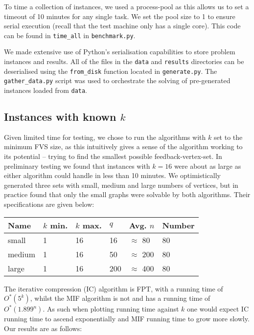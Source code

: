 \documentclass[a4paper,12pt]{article}
\newcommand{\OStar}{O^*}
\begin{document}
To time a collection of instances, we used a process-pool as this allows us to set a timeout of 10 minutes for any single task. We set the pool size to 1 to ensure serial execution (recall that the test machine only has a single core). This code can be found in \texttt{time\_all} in \texttt{benchmark.py}.

We made extensive use of Python's serialisation capabilities to store problem instances and results. All of the files in the \texttt{data} and \texttt{results} directories can be deserialised using the \texttt{from\_disk} function located in \texttt{generate.py}. The \texttt{gather\_data.py} script was used to orchestrate the solving of pre-generated instances loaded from \texttt{data}.

\subsection{Instances with known $k$}

Given limited time for testing, we chose to run the algorithms with $k$ set to the minimum FVS size, as this intuitively gives a sense of the algorithm working to its potential -- trying to find the smallest possible feedback-vertex-set. In preliminary testing we found that instances with $k = 16$ were about as large as either algorithm could handle in less than 10 minutes. We optimistically generated three sets with small, medium and large numbers of vertices, but in practice found that only the small graphs were solvable by both algorithms. Their specifications are given below:

\begin{tabular}{|l|l|l|l|l|l|}
\hline
\textbf{Name} & \textbf{$k$ min.} & \textbf{$k$ max.} & $q$ & \textbf{Avg. $n$} & \textbf{Number} \\ \hline
small & 1 & 16 & 16 & $\approx$ 80 & 80 \\ \hline
medium & 1 & 16 & 50 & $\approx$ 200 & 80 \\ \hline
large & 1 & 16 & 200 & $\approx$ 400 & 80 \\ \hline
\end{tabular}

The iterative compression (IC) algorithm is FPT, with a running time of $\OStar(5^k)$, whilst the MIF algorithm is not and has a running time of $\OStar(1.899^n)$. As such when plotting running time against $k$ one would expect IC running time to ascend exponentially and MIF running time to grow more slowly. Our results are as follows:
\end{document}
